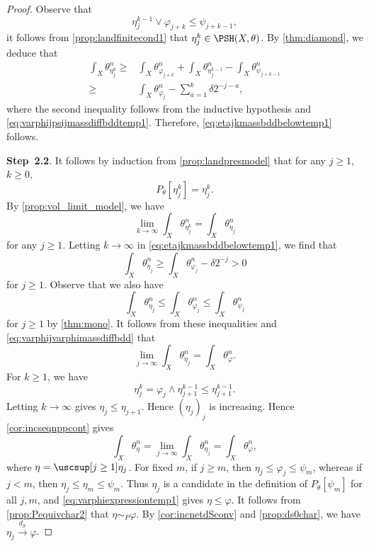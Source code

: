 \begin{proof}
    Observe that
    \[
    \eta_j^{k-1}\lor \varphi_{j+k}\leq \psi_{j+k-1},
    \]
    it follows from \cref{prop:landfinitecond1} that $\eta_j^k\in \PSH(X,\theta)$. By \cref{thm:diamond}, we deduce that
    \[
    \begin{aligned}
        \int_X \theta_{\eta_j^k}^n\geq & \int_X \theta_{\varphi_{j+k}}^n+  \int_X \theta_{\eta_j^{k-1}}^n-\int_X \theta_{\psi_{j+k-1}}^n\\
        \geq & \int_X \theta_{\varphi_j}^n-\sum_{a=1}^{k} \delta 2^{-j-a},
    \end{aligned}
    \]
    where the second inequality follows from the inductive hypothesis and \eqref{eq:varphijpsijmassdiffbddtemp1}. Therefore, \eqref{eq:etajkmassbddbelowtemp1} follows.


    \textbf{Step~2.2}.
    It follows by induction from \cref{prop:landpresmodel} that for any $j\geq 1$, $k\geq 0$,
    \[
        P_{\theta}\left[\eta_j^k\right]=\eta_j^k.
    \]
    By \cref{prop:vol_limit_model}, we have
    \[
        \lim_{k\to\infty} \int_X \theta_{\eta_j^k}^n=\int_X \theta_{\eta_j}^n
    \]
    for any $j\geq 1$.
    Letting $k\to\infty$ in \eqref{eq:etajkmassbddbelowtemp1}, we find that
    \[
        \int_X \theta_{\eta_j}^n\geq \int_X \theta_{\varphi_j}^n-\delta 2^{-j}>0
    \]
    for $j\geq 1$.
    Observe that we also have
    \[
        \int_X \theta_{\eta_j}^n\leq \int_X \theta_{\varphi_j}^n \leq \int_X \theta_{\psi_j}^n
    \]
    for $j\geq 1$ by \cref{thm:mono}.
    It follows from these inequalities and \eqref{eq:varphijvarphimassdiffbdd} that
    \[
        \lim_{j\to\infty}\int_X\theta_{\eta_j}^n=\int_X\theta_{\varphi}^n.
    \]
    For $k\geq 1$, we have
    \[
        \eta_j^k=\varphi_j\land\eta_{j+1}^{k-1}\leq \eta_{j+1}^{k-1}.
    \]
    Letting $k\to\infty$ gives $\eta_j\leq\eta_{j+1}$. Hence $(\eta_j)_j$ is increasing. Hence \cref{cor:incseqnppcont} gives
    \[
        \int_X \theta_{\eta}^n=\lim_{j\to\infty}\int_X \theta_{\eta_j}^n=\int_X \theta_{\varphi}^n,
    \]
    where $\eta=\uscsup[j\geq 1] \eta_j$.
    For fixed $m$, if $j\geq m$, then $\eta_j\leq\varphi_j\leq\psi_m$, whereas if $j<m$, then $\eta_j\leq\eta_m\leq\psi_m$. Thus $\eta_j$ is a candidate in the definition of $P_{\theta}[\psi_m]$ for all $j,m$, and \eqref{eq:varphiexpressiontemp1} gives $\eta\leq \varphi$.
    It follows from \cref{prop:Pequivchar2} that $\eta\sim_P \varphi$. By \cref{cor:incnetdSconv} and \cref{prop:ds0char}, we have $\eta_j\xrightarrow{d_S}\varphi$.
\end{proof}


